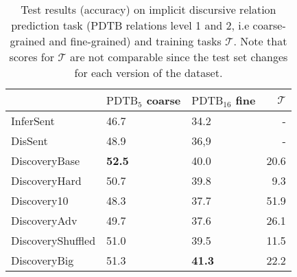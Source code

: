 \documentclass[11pt,a4paper]{article}
\begin{document}
 \begin{table}[htb]
\begin{small}
\begin{center}
\begin{tabular}{lp{1cm}p{1cm}r}
\toprule
{} &  $\text{PDTB}_5$ coarse&  $\text{PDTB}_{16}$ fine&   $\mathcal T$ \\
\midrule
InferSent          &  46.7 &   34.2 &  - \\
DisSent & 48.9& 36,9 & - \\
DiscoveryBase         &  \textbf{52.5} &   40.0 &  20.6 \\
DiscoveryHard     &  50.7 &   39.8 &   9.3 \\
Discovery10       &  48.3 &   37.7 &  51.9 \\
DiscoveryAdv      &  49.7 &   37.6 &  26.1 \\
DiscoveryShuffled &  51.0 &   39.5 &  11.5 \\
DiscoveryBig      &  51.3 &   \textbf{41.3} &  22.2 \\
\bottomrule
\end{tabular}
\end{center}
\caption{Test results (accuracy) on implicit discursive relation prediction task (PDTB relations level 1 and 2, i.e coarse-grained and fine-grained) and training tasks $\mathcal T$. Note that scores for $\mathcal T$ are not comparable since the test set changes for each version of the dataset. }
\label{table:disctasks}
\end{small}
\end{table}
 
 
\end{document}
